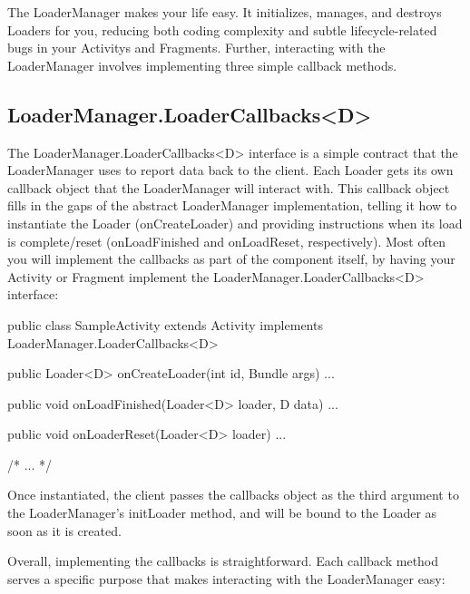 The LoaderManager makes your life easy. It initializes, manages, and destroys Loaders for you, reducing both coding complexity and subtle lifecycle-related bugs in your Activitys and Fragments. Further, interacting with the LoaderManager involves implementing three simple callback methods.

\subsection{LoaderManager.LoaderCallbacks<D>}
The LoaderManager.LoaderCallbacks<D> interface is a simple contract that the LoaderManager uses to report data back to the client. Each Loader gets its own callback object that the LoaderManager will interact with. This callback object fills in the gaps of the abstract LoaderManager implementation, telling it how to instantiate the Loader (onCreateLoader) and providing instructions when its load is complete/reset (onLoadFinished and onLoadReset, respectively). Most often you will implement the callbacks as part of the component itself, by having your Activity or Fragment implement the LoaderManager.LoaderCallbacks<D> interface:

\begin{android}
public class SampleActivity extends Activity implements LoaderManager.LoaderCallbacks<D> {
	
	public Loader<D> onCreateLoader(int id, Bundle args) { ... }
	
	public void onLoadFinished(Loader<D> loader, D data) { ... }
	
	public void onLoaderReset(Loader<D> loader) { ... }
	
	/* ... */
}	
\end{android}

Once instantiated, the client passes the callbacks object  as the third argument to the LoaderManager’s initLoader method, and will be bound to the Loader as soon as it is created.

Overall, implementing the callbacks is straightforward. Each callback method serves a specific purpose that makes interacting with the LoaderManager easy:


